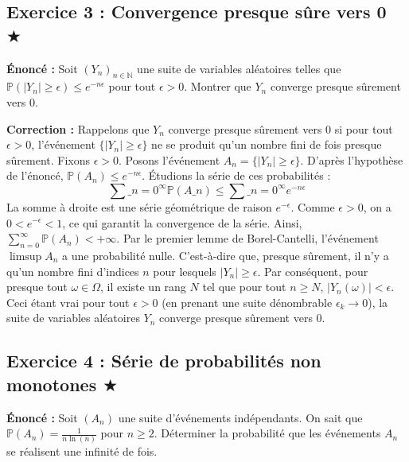 \documentclass[11pt,a4paper]{article}
\begin{document}
\subsection*{Exercice 3 : Convergence presque sûre vers 0 \quad $\bigstar$}





\textbf{Énoncé :}
Soit $(Y_n)_{n \in \mathbb{N}}$ une suite de variables aléatoires telles que $\mathbb{P}(|Y_n| \ge \epsilon) \le e^{-n\epsilon}$ pour tout $\epsilon > 0$.
Montrer que $Y_n$ converge presque sûrement vers 0.

\textbf{Correction :}
Rappelons que $Y_n$ converge presque sûrement vers 0 si pour tout $\epsilon > 0$, l'événement $\{|Y_n| \ge \epsilon\}$ ne se produit qu'un nombre fini de fois presque sûrement.
Fixons $\epsilon > 0$.
Posons l'événement $A_n = \{|Y_n| \ge \epsilon\}$.
D'après l'hypothèse de l'énoncé, $\mathbb{P}(A_n) \le e^{-n\epsilon}$.
Étudions la série de ces probabilités :
$$ \sum\_{n=0}^\infty \mathbb{P}(A\_n) \le \sum\_{n=0}^\infty e^{-n\epsilon} $$
La somme à droite est une série géométrique de raison $e^{-\epsilon}$. Comme $\epsilon > 0$, on a $0 < e^{-\epsilon} < 1$, ce qui garantit la convergence de la série.
Ainsi, $\sum_{n=0}^\infty \mathbb{P}(A_n) < +\infty$.
Par le premier lemme de Borel-Cantelli, l'événement $\limsup A_n$ a une probabilité nulle.
C'est-à-dire que, presque sûrement, il n'y a qu'un nombre fini d'indices $n$ pour lesquels $|Y_n| \ge \epsilon$.
Par conséquent, pour presque tout $\omega \in \Omega$, il existe un rang $N$ tel que pour tout $n \ge N$, $|Y_n(\omega)| < \epsilon$.
Ceci étant vrai pour tout $\epsilon > 0$ (en prenant une suite dénombrable $\epsilon_k \to 0$), la suite de variables aléatoires $Y_n$ converge presque sûrement vers 0.


\subsection*{Exercice 4 : Série de probabilités non monotones \quad $\bigstar$}





\textbf{Énoncé :}
Soit $(A_n)$ une suite d'événements indépendants. On sait que $\mathbb{P}(A_n) = \frac{1}{n \ln(n)}$ pour $n \ge 2$.
Déterminer la probabilité que les événements $A_n$ se réalisent une infinité de fois.
\end{document}
